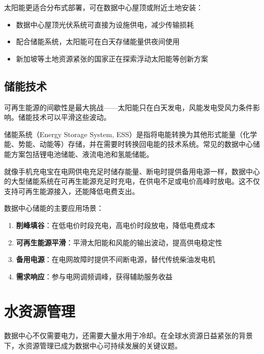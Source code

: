 太阳能更适合分布式部署，可在数据中心屋顶或附近土地安装：
\begin{itemize}
    \item 数据中心屋顶光伏系统可直接为设施供电，减少传输损耗
    \item 配合储能系统，太阳能可在白天存储能量供夜间使用
    \item 新加坡等土地资源紧张的国家正在探索浮动太阳能等创新方案
\end{itemize}

\subsection{储能技术}

可再生能源的间歇性是最大挑战——太阳能只在白天发电，风能发电受风力条件影响。储能技术可以平滑这些波动。

\begin{definition}[储能系统]
储能系统（Energy Storage System, ESS）是指将电能转换为其他形式能量（化学能、势能、动能等）存储，并在需要时转换回电能的技术系统。常见的数据中心储能方案包括锂电池储能、液流电池和氢能储能。
\end{definition}

\begin{analogy}
就像手机充电宝在电网供电充足时储存能量、断电时提供备用电源一样，数据中心的大型储能系统在可再生能源充足时充电，在供电不足或电价高峰时放电。这不仅支持可再生能源接入，还能降低电费支出。
\end{analogy}

数据中心储能的主要应用场景：
\begin{enumerate}
    \item \textbf{削峰填谷}：在低电价时段充电，高电价时段放电，降低电费成本
    \item \textbf{可再生能源平滑}：平滑太阳能和风能的输出波动，提高供电稳定性
    \item \textbf{备用电源}：在电网故障时提供不间断电源，替代传统柴油发电机
    \item \textbf{需求响应}：参与电网调频调峰，获得辅助服务收益
\end{enumerate}

\section{水资源管理}\label{sec:water-management}

数据中心不仅需要电力，还需要大量水用于冷却。在全球水资源日益紧张的背景下，水资源管理已成为数据中心可持续发展的关键议题。

